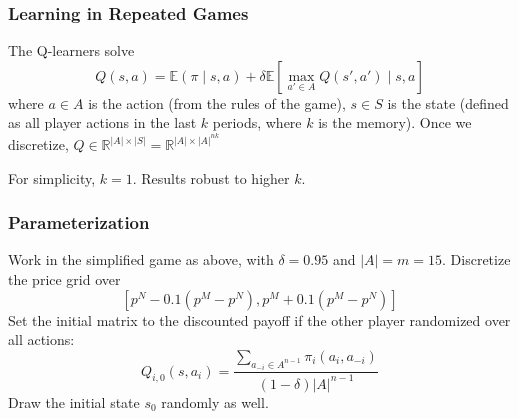 \documentclass{beamer}
\begin{document}
\begin{frame}\frametitle{Learning in Repeated Games}
	The Q-learners solve \[Q(s,a) = \mathbb{E}(\pi \mid s,a) + \delta \mathbb{E}\left[ \max_{a'\in A} Q(s',a') \mid s,a\right]\] where $a \in A$ is the action (from the rules of the game), $s \in S$ is the state (defined as all player actions in the last $k$ periods, where $k$ is the memory). Once we discretize, $Q \in \mathbb{R}^{|A| \times |S|} = \mathbb{R}^{|A| \times |A|^{nk}}$
	
	For simplicity, $k=1$. Results robust to higher $k$.
\end{frame}

\begin{frame}\frametitle{Parameterization}
	Work in the simplified game as above, with $\delta = 0.95$ and $|A| = m = 15$. Discretize the price grid over \[\left[p^N - 0.1(p^M - p^N), p^M + 0.1(p^M - p^N)\right]\] Set the initial matrix to the discounted payoff if the other player randomized over all actions: \[Q_{i,0}(s,a_i) = \frac{\sum_{a_{-i} \in A^{n-1}}\pi_i(a_i,a_{-i})}{(1-\delta) |A|^{n-1}}\]Draw the initial state $s_0$ randomly as well.
\end{frame}
\end{document}
